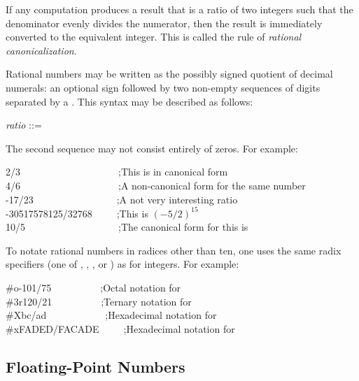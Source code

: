 If any computation produces a result that is a ratio of
two integers such that the denominator evenly divides the
numerator, then the result is immediately converted to the equivalent
integer.  This is called the rule of \emph{rational canonicalization}.

Rational numbers may be written as the possibly signed quotient of
decimal numerals: an optional sign followed by two non-empty sequences of
digits separated by a \cdf{/}.  This syntax may be described as
follows:

\begin{tabbing}
\emph{ratio} ::=   \cdf{/} 
\end{tabbing}

The second sequence may not consist
entirely of zeros.
For example:
\begin{lisp}
2/3~~~~~~~~~~~~~~~~~~~~;\textrm{This is in canonical form} \\
4/6~~~~~~~~~~~~~~~~~~~~;\textrm{A non-canonical form for the same number} \\
-17/23~~~~~~~~~~~~~~~~~;\textrm{A not very interesting ratio} \\
-30517578125/32768~~~~~;\textrm{This is $(-5/2)^{15}$} \\
10/5~~~~~~~~~~~~~~~~~~~;\textrm{The canonical form for this is }
\end{lisp}

To notate rational numbers in radices other than ten,
one uses the same radix specifiers
(one of , , , or ) as for integers.
For example:

\begin{lisp}
\#o-101/75~~~~~~~~~~;\textrm{Octal notation for } \\
\#3r120/21~~~~~~~~~~;\textrm{Ternary notation for } \\
\#Xbc/ad~~~~~~~~~~~~;\textrm{Hexadecimal notation for } \\
\#xFADED/FACADE~~~~~;\textrm{Hexadecimal notation for }
\end{lisp}

\subsection{Floating-Point Numbers}

